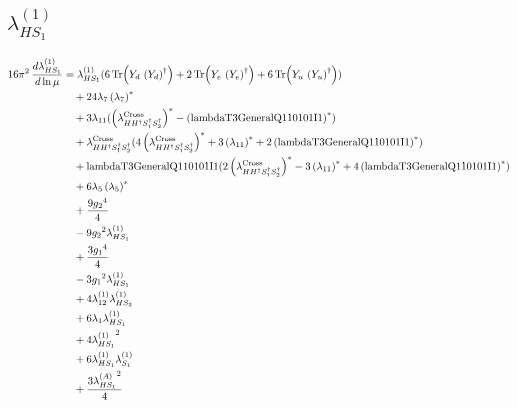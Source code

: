 \documentclass[10pt,a4paper]{article}
\begin{document}
\subsection*{$\lambda_{HS_1}^{(1)}$}
\begin{align*}
16\pi^2\,\frac{d \lambda_{HS_1}^{(1)}}{d\ln\mu} &={\lambda_{HS_1}^{(1)}} (6 \operatorname{Tr}\!\left({Y_d}\,\left({Y_d}\right)^{\dagger}\right)+2 \operatorname{Tr}\!\left({Y_e}\,\left({Y_e}\right)^{\dagger}\right)+6 \operatorname{Tr}\!\left({Y_u}\,\left({Y_u}\right)^{\dagger}\right)) \\
&\quad +24 {\lambda_{7}} \left({\lambda_{7}}\right)^{*} \\
&\quad +3 {\lambda_{11}} (\left({\lambda_{H H^\dagger S_1^\dagger S_2^\dagger}^{\rm Cross}}\right)^{*}-\left(\text{lambdaT3GeneralQ110101I1}\right)^{*}) \\
&\quad +{\lambda_{H H^\dagger S_1^\dagger S_2^\dagger}^{\rm Cross}} (4 \left({\lambda_{H H^\dagger S_1^\dagger S_2^\dagger}^{\rm Cross}}\right)^{*}+3 \left({\lambda_{11}}\right)^{*}+2 \left(\text{lambdaT3GeneralQ110101I1}\right)^{*}) \\
&\quad +\text{lambdaT3GeneralQ110101I1} (2 \left({\lambda_{H H^\dagger S_1^\dagger S_2^\dagger}^{\rm Cross}}\right)^{*}-3 \left({\lambda_{11}}\right)^{*}+4 \left(\text{lambdaT3GeneralQ110101I1}\right)^{*}) \\
&\quad +6 {\lambda_5} \left({\lambda_5}\right)^{*} \\
&\quad +\frac{9 {g_2}^4}{4} \\
&\quad -9 {g_2}^2 {\lambda_{HS_1}^{(1)}} \\
&\quad +\frac{3 {g_1}^4}{4} \\
&\quad -3 {g_1}^2 {\lambda_{HS_1}^{(1)}} \\
&\quad +4 {\lambda_{12}^{(1)}} {\lambda_{HS_2}^{(1)}} \\
&\quad +6 {\lambda_1} {\lambda_{HS_1}^{(1)}} \\
&\quad +4 {\lambda_{HS_1}^{(1)}}^2 \\
&\quad +6 {\lambda_{HS_1}^{(1)}} {\lambda_{S_1}^{(1)}} \\
&\quad +\frac{3 {\lambda_{HS_1}^{(A)}}^2}{4} \\
\end{align*}
\end{document}
